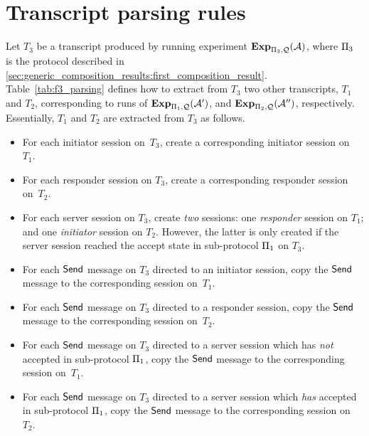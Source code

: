 \chapter{Transcript parsing rules}\label{sec:appendix:full_proofs}
Let $T_3$ be a transcript produced by running experiment $\mathbf{Exp}_{\mathrm{\Pi}_3,\mathcal{Q}}(\mathcal{A})$,
where  $\mathrm{\Pi}_3$ is the protocol described in \cref{sec:generic_composition_results:first_composition_result}.
Table~\ref{tab:f3_parsing} defines how to extract from $T_3$
two other transcripts,
$T_1$ and $T_2$,
corresponding to runs of $\mathbf{Exp}_{\mathrm{\Pi}_1,\mathcal{Q}}(\mathcal{A}')$, and $\mathbf{Exp}_{\mathrm{\Pi}_2,\mathcal{Q}}(\mathcal{A}'')$,
respectively.
Essentially, $T_1$ and $T_2$ are extracted from $T_3$ as follows.
\begin{itemize}
	\item For each initiator session on~$T_3$,
	create a corresponding initiator session on~$T_1$.
	
	\item For each responder session on $T_3$,
	create a corresponding responder session on~$T_2$.

	\item For each server session on $T_3$, 
	create \emph{two} sessions:
	one \emph{responder} session on $T_1$;
	and one \emph{initiator} session on  $T_2$.
	However, the latter is only created if the server session reached the accept state in sub-protocol $\mathrm{\Pi}_1$ on $T_3$.
	
	
	\item For each $\mathsf{Send}$ message on $T_3$ directed to an initiator session,
	copy the $\mathsf{Send}$ message to the corresponding session on~$T_1$.
		
	\item For each $\mathsf{Send}$ message on $T_3$ directed to a responder session,
	copy the $\mathsf{Send}$ message to the corresponding session on~$T_2$.
	
	\item For each $\mathsf{Send}$ message on $T_3$ directed to a server session which has \emph{not} accepted in sub-protocol $\mathrm{\Pi}_1$,
	copy the $\mathsf{Send}$ message to the corresponding session on~$T_1$.

	
	\item For each $\mathsf{Send}$ message on $T_3$ directed to a server session which \emph{has} accepted in sub-protocol $\mathrm{\Pi}_1$,
	copy the $\mathsf{Send}$ message to the corresponding session on~$T_2$.
	
\end{itemize}


